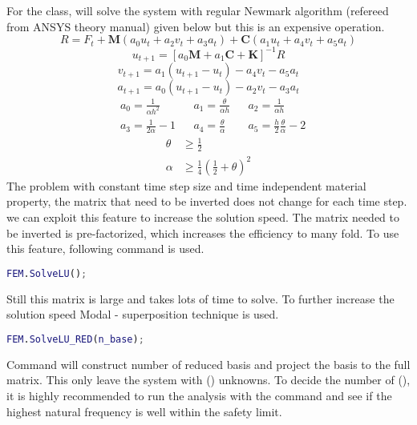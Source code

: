 \documentclass[main.tex]{subfiles}
\begin{document}
For the  class,  will solve the system with regular Newmark algorithm (refereed from ANSYS theory manual) given below but this is an expensive operation. 
\begin{equation*}
R=F_t + \mathbf{M} \left(a_0 u_{t}+a_2 v_{t} + a_3 a_{t} \right) + \mathbf{C} \left(a_1 u_{t}+a_4 v_{t} + a_5 a_{t} \right) 
\end{equation*}
\begin{equation*}
u_{t+1}=\left[a_0 \mathbf{M} + a_1 \mathbf{C} + \mathbf{K} \right] ^ {-1} R
\end{equation*}
\begin{equation*}
v_{t+1}=a_1 \left( u_{t+1} - u_{t} \right) - a_4 v_t -a_5 a_t
\end{equation*}
\begin{equation*}
a_{t+1}=a_0 \left( u_{t+1} - u_{t}\right) - a_2 v_t -a_3 a_t
\end{equation*}
\begin{align*}
&a_0 = \frac{1}{\alpha h^2}& 
&a_1 = \frac{\theta}{\alpha h} & 
&a_2 = \frac{1}{\alpha h} \\
&a_3 = \frac{1}{2 \alpha }-1 &  
&a_4 = \frac{\theta}{\alpha} & 
& a_5 = \frac{h}{2} \frac{\theta}{\alpha}-2
\end{align*}
\begin{align*}
\theta & \geq \frac{1}{2}  \\
\alpha & \geq \frac{1}{4}\left(\frac{1}{2}+\theta \right)^2
\end{align*}
The problem with constant time step size and time independent material property, the matrix that need to be inverted does not change for each time step. we can exploit this feature to increase the solution speed. The matrix needed to be inverted is pre-factorized, which increases the efficiency to many fold. To use this feature, following command is used.
\begin{lstlisting}[language=matlab]
FEM.SolveLU();
\end{lstlisting}
Still this matrix is large and takes lots of time to solve. To further increase the solution speed Modal - superposition  technique is used.
 \begin{lstlisting}[language=matlab]
FEM.SolveLU_RED(n_base);
\end{lstlisting}
Command will construct number of reduced basis and project the basis to the full matrix. This only leave the system with   () unknowns. To decide the number of (), it is highly recommended to run the  analysis with the command  and see if the highest natural frequency is well within the safety limit. 
\end{document}
